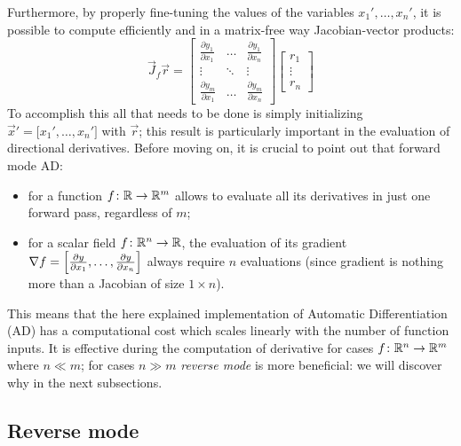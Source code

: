 Furthermore, by properly fine-tuning the values of the variables $x_1', \dots, x_n'$, it is possible to compute efficiently and in a matrix-free way Jacobian-vector products:
\[
\vec{J}_f \vec{r} =
\begin{bmatrix}
	\frac{\partial y_1}{\partial x_1} &  \dots  & \frac{\partial y_1}{\partial x_n}  \\
	\vdots							  & \ddots  & \vdots							 \\
	\frac{\partial y_m}{\partial x_1} &  \dots  & \frac{\partial y_m}{\partial x_n}
\end{bmatrix}
\begin{bmatrix}
	r_1		\\
	\vdots  \\
	r_n
\end{bmatrix}
\]
To accomplish this all that needs to be done is simply initializing $\vec{x}'=\big[x_1', \dots, x_n' \big]$ with $\vec{r}$; this result is particularly important in the evaluation of directional derivatives.
Before moving on, it is crucial to point out that forward mode AD:
\begin{itemize}
	\item for a function $f \colon \mathbb{R} \to \mathbb{R}^m$ allows to evaluate all its derivatives in just one forward pass, regardless of $m$;
	\item for a scalar field $f \colon \mathbb{R}^n \to \mathbb{R}$, the evaluation of its gradient $\nabla f = \Bigl[ \frac{\partial y}{\partial x_1}, \dots, \frac{\partial y}{\partial x_n} \Bigr]$ always require $n$ evaluations (since gradient is nothing more than a Jacobian of size $1 \times n$).
\end{itemize}
This means that the here explained implementation of Automatic Differentiation (AD) has a computational cost which scales linearly with the number of function inputs. It is effective during the computation of derivative for cases $f \colon \mathbb{R}^n \to \mathbb{R}^m$ where $n \ll m$; for cases $n \gg m$ \emph{reverse mode} is more beneficial: we will discover why in the next subsections.


\subsection{Reverse mode}
\label{subsec:reverse_mode_AD}

